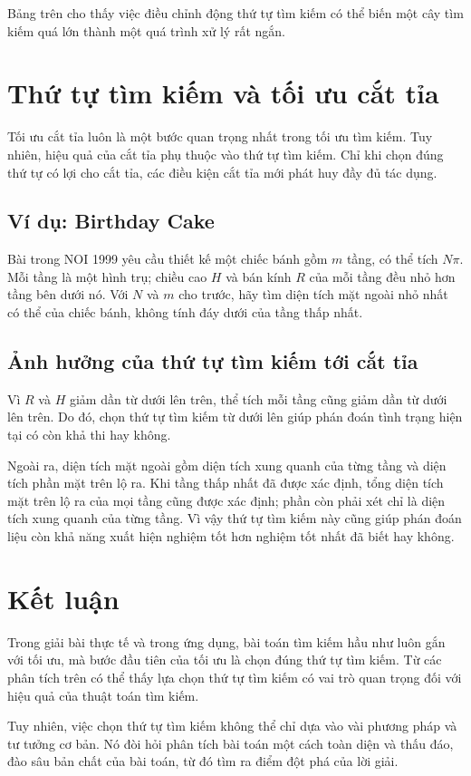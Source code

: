 \documentclass[11pt]{article}
\begin{document}
Bảng trên cho thấy việc điều chỉnh động thứ tự tìm kiếm có thể biến một cây
tìm kiếm quá lớn thành một quá trình xử lý rất ngắn.

\section{Thứ tự tìm kiếm và tối ưu cắt tỉa}

Tối ưu cắt tỉa luôn là một bước quan trọng nhất trong tối ưu tìm kiếm. Tuy
nhiên, hiệu quả của cắt tỉa phụ thuộc vào thứ tự tìm kiếm. Chỉ khi chọn đúng
thứ tự có lợi cho cắt tỉa, các điều kiện cắt tỉa mới phát huy đầy đủ tác dụng.

\subsection{Ví dụ: Birthday Cake}

Bài  trong NOI 1999 yêu cầu thiết kế một chiếc bánh gồm
\(m\) tầng, có thể tích \(N\pi\). Mỗi tầng là một hình trụ; chiều cao \(H\)
và bán kính \(R\) của mỗi tầng đều nhỏ hơn tầng bên dưới nó. Với \(N\) và
\(m\) cho trước, hãy tìm diện tích mặt ngoài nhỏ nhất có thể của chiếc bánh,
không tính đáy dưới của tầng thấp nhất.

\subsection{Ảnh hưởng của thứ tự tìm kiếm tới cắt tỉa}

Vì \(R\) và \(H\) giảm dần từ dưới lên trên, thể tích mỗi tầng cũng giảm dần
từ dưới lên trên. Do đó, chọn thứ tự tìm kiếm từ dưới lên giúp phán đoán tình
trạng hiện tại có còn khả thi hay không.

Ngoài ra, diện tích mặt ngoài gồm diện tích xung quanh của từng tầng và diện
tích phần mặt trên lộ ra. Khi tầng thấp nhất đã được xác định, tổng diện tích
mặt trên lộ ra của mọi tầng cũng được xác định; phần còn phải xét chỉ là diện
tích xung quanh của từng tầng. Vì vậy thứ tự tìm kiếm này cũng giúp phán đoán
liệu còn khả năng xuất hiện nghiệm tốt hơn nghiệm tốt nhất đã biết hay không.

\section{Kết luận}

Trong giải bài thực tế và trong ứng dụng, bài toán tìm kiếm hầu như luôn gắn
với tối ưu, mà bước đầu tiên của tối ưu là chọn đúng thứ tự tìm kiếm. Từ các
phân tích trên có thể thấy lựa chọn thứ tự tìm kiếm có vai trò quan trọng đối
với hiệu quả của thuật toán tìm kiếm.

Tuy nhiên, việc chọn thứ tự tìm kiếm không thể chỉ dựa vào vài phương pháp và
tư tưởng cơ bản. Nó đòi hỏi phân tích bài toán một cách toàn diện và thấu
đáo, đào sâu bản chất của bài toán, từ đó tìm ra điểm đột phá của lời giải.
\end{document}
